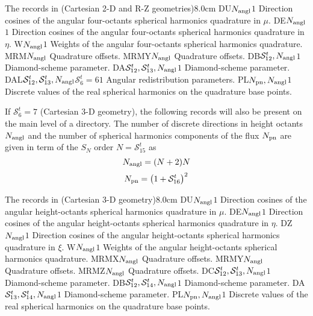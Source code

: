\begin{DescriptionEnregistrement}{The  records in
 (Cartesian 2-D and R-Z geometries)}{8.0cm}
\RealEnr
  {DU}{$N_{\rm angl}$}{$1$}
  {Direction cosines of the angular four-octants spherical harmonics quadrature in $\mu$.} 
\RealEnr
  {DE}{$N_{\rm angl}$}{$1$}
  {Direction cosines of the angular four-octants spherical harmonics quadrature in $\eta$.} 
\RealEnr
  {W}{$N_{\rm angl}$}{$1$}
  {Weights of the angular four-octants spherical harmonics quadrature.} 
\IntEnr
  {MRM}{$N_{\rm angl}$}
  {Quadrature offsets.} 
\IntEnr
  {MRMY}{$N_{\rm angl}$}
  {Quadrature offsets.} 
\RealEnr
  {DB}{$\mathcal{S}^{t}_{12},N_{\rm angl}$}{$1$}
  {Diamond-scheme parameter.} 
\RealEnr
  {DA}{$\mathcal{S}^{t}_{12},\mathcal{S}^{t}_{13},N_{\rm angl}$}{$1$}
  {Diamond-scheme parameter.} 
\OptRealEnr
  {DAL}{$\mathcal{S}^{t}_{12},\mathcal{S}^{t}_{13},N_{\rm angl}$}{$\mathcal{S}^{t}_{6}=6$}{$1$}
  {Angular redistribution parameters.} 
\RealEnr
  {PL}{$N_{\rm pn},N_{\rm angl}$}{$1$}
  {Discrete values of the real spherical harmonics on the quadrature base points.} 
\end{DescriptionEnregistrement}

If $\mathcal{S}^{t}_{6}=7$ (Cartesian 3-D geometry), the following records will also be present on the main level of a 
directory. The number of discrete directions in height octants  $N_{\rm angl}$ and the number of spherical harmonics components of the flux $N_{\rm pn}$
are given in term of the $S_N$ order $N=\mathcal{S}^{t}_{15}$ as
$$
N_{\rm angl}=(N+2)N
$$
$$
N_{\rm pn}=\left( 1+\mathcal{S}^{t}_{16}\right)^{2}
$$

\begin{DescriptionEnregistrement}{The  records in
 (Cartesian 3-D geometry)}{8.0cm}
\RealEnr
  {DU}{$N_{\rm angl}$}{$1$}
  {Direction cosines of the angular height-octants spherical harmonics quadrature in $\mu$.} 
\RealEnr
  {DE}{$N_{\rm angl}$}{$1$}
  {Direction cosines of the angular height-octants spherical harmonics quadrature in $\eta$.} 
\RealEnr
  {DZ}{$N_{\rm angl}$}{$1$}
  {Direction cosines of the angular height-octants spherical harmonics quadrature in $\xi$.} 
\RealEnr
  {W}{$N_{\rm angl}$}{$1$}
  {Weights of the angular height-octants spherical harmonics quadrature.} 
\IntEnr
  {MRMX}{$N_{\rm angl}$}
  {Quadrature offsets.} 
\IntEnr
  {MRMY}{$N_{\rm angl}$}
  {Quadrature offsets.} 
\IntEnr
  {MRMZ}{$N_{\rm angl}$}
  {Quadrature offsets.} 
\RealEnr
  {DC}{$\mathcal{S}^{t}_{12},\mathcal{S}^{t}_{13},N_{\rm angl}$}{$1$}
  {Diamond-scheme parameter.} 
\RealEnr
  {DB}{$\mathcal{S}^{t}_{12},\mathcal{S}^{t}_{14},N_{\rm angl}$}{$1$}
  {Diamond-scheme parameter.} 
\RealEnr
  {DA}{$\mathcal{S}^{t}_{13},\mathcal{S}^{t}_{14},N_{\rm angl}$}{$1$}
  {Diamond-scheme parameter.} 
\RealEnr
  {PL}{$N_{\rm pn},N_{\rm angl}$}{$1$}
  {Discrete values of the real spherical harmonics on the quadrature base points.} 
\end{DescriptionEnregistrement}

\eject
